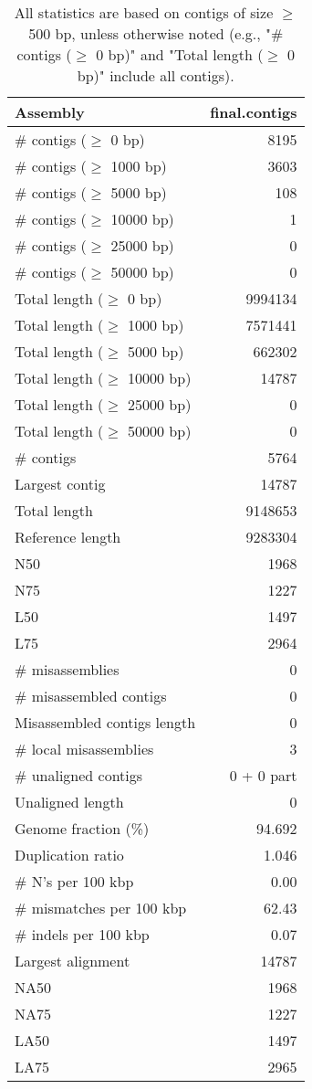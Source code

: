 \documentclass[12pt,a4paper]{article}
\begin{document}
\begin{table}[ht]
\begin{center}
\caption{All statistics are based on contigs of size $\geq$ 500 bp, unless otherwise noted (e.g., "\# contigs ($\geq$ 0 bp)" and "Total length ($\geq$ 0 bp)" include all contigs).}
\begin{tabular}{|l*{1}{|r}|}
\hline
Assembly & final.contigs \\ \hline
\# contigs ($\geq$ 0 bp) & 8195 \\ \hline
\# contigs ($\geq$ 1000 bp) & 3603 \\ \hline
\# contigs ($\geq$ 5000 bp) & 108 \\ \hline
\# contigs ($\geq$ 10000 bp) & 1 \\ \hline
\# contigs ($\geq$ 25000 bp) & 0 \\ \hline
\# contigs ($\geq$ 50000 bp) & 0 \\ \hline
Total length ($\geq$ 0 bp) & 9994134 \\ \hline
Total length ($\geq$ 1000 bp) & 7571441 \\ \hline
Total length ($\geq$ 5000 bp) & 662302 \\ \hline
Total length ($\geq$ 10000 bp) & 14787 \\ \hline
Total length ($\geq$ 25000 bp) & 0 \\ \hline
Total length ($\geq$ 50000 bp) & 0 \\ \hline
\# contigs & 5764 \\ \hline
Largest contig & 14787 \\ \hline
Total length & 9148653 \\ \hline
Reference length & 9283304 \\ \hline
N50 & 1968 \\ \hline
N75 & 1227 \\ \hline
L50 & 1497 \\ \hline
L75 & 2964 \\ \hline
\# misassemblies & 0 \\ \hline
\# misassembled contigs & 0 \\ \hline
Misassembled contigs length & 0 \\ \hline
\# local misassemblies & 3 \\ \hline
\# unaligned contigs & 0 + 0 part \\ \hline
Unaligned length & 0 \\ \hline
Genome fraction (\%) & 94.692 \\ \hline
Duplication ratio & 1.046 \\ \hline
\# N's per 100 kbp & 0.00 \\ \hline
\# mismatches per 100 kbp & 62.43 \\ \hline
\# indels per 100 kbp & 0.07 \\ \hline
Largest alignment & 14787 \\ \hline
NA50 & 1968 \\ \hline
NA75 & 1227 \\ \hline
LA50 & 1497 \\ \hline
LA75 & 2965 \\ \hline
\end{tabular}
\end{center}
\end{table}
\end{document}
